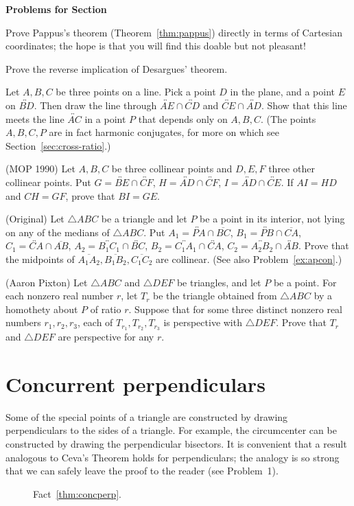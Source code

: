 \documentclass[12pt]{book}
\newcounter{exc}
\numberwithin{exc}{section}
\numberwithin{figure}{section}
\newenvironment{exer}{\vspace{0.1in}
\noindent \textbf{Problems for Section~\thesection} \vspace{0.1in}
\begin{list}{\arabic{exc}.}{\usecounter{exc}}}{\end{list}}
\numberwithin{equation}{theorem}
\def\ii{\item}
\def\line#1{\overleftrightarrow{#1}}
\def\seg#1{\overline{#1}}
\begin{document}
\begin{exer}
\ii
Prove Pappus's theorem (Theorem~\ref{thm:pappus}) directly in terms of 
Cartesian coordinates; the hope is that you will find this doable but not 
pleasant!
\ii \label{ex:des2}
Prove the reverse implication of Desargues' theorem.
 
\ii \label{ex:harmcon}
Let $A,B,C$ be three points on a line. Pick a point $D$ in the plane, 
and a point $E$ on $\line{BD}$. Then draw the line through $\line{AE} \cap 
\line{CD}$ and 
$\line{CE} \cap \line{AD}$. 
Show that this line meets the line $\line{AC}$ in a point $P$ 
that depends only on $A,B,C$. (The points $A,B,C,P$ are in fact harmonic
conjugates, 
for more on which see Section~\ref{sec:cross-ratio}.)
\ii (MOP 1990)
Let $A, B, C$ be three collinear points and $D, E, F$ three other 
collinear points. Put $G = \line{BE} \cap \line{CF}$, 
$H = \line{AD} \cap \line{CF}$, $I = \line{AD} \cap 
\line{CE}$. If $AI = HD$ and $CH = GF$, prove that $BI = GE$.
\ii (Original) \label{ex:apcon1}
Let $\triangle ABC$ be a triangle and 
let $P$ be a point in its interior, not lying on 
any of the medians of $\triangle ABC$. 
Put $A_1 = \line{PA} \cap \seg{BC}$,
$B_1 = \line{PB} \cap \seg{CA}$,
$C_1 = \line{CA} \cap \seg{AB}$,
$A_2 = \line{B_1C_1} \cap \line{BC}$,
$B_2 = \line{C_1A_1} \cap \line{CA}$,
$C_2 = \line{A_2B_2} \cap \line{AB}$.
Prove that the 
midpoints of $\seg{A_1A_2}, \seg{B_1B_2}, \seg{C_1C_2}$ 
are collinear. (See also
Problem~\ref{ex:apcon}.)
\ii (Aaron Pixton) 
Let $\triangle ABC$ 
and $\triangle DEF$ be triangles, and let $P$ be a point.
For each nonzero real number $r$, let $T_r$ be the triangle obtained
from $\triangle ABC$ by a homothety about $P$ of ratio $r$. Suppose that for
some three distinct nonzero real numbers
$r_1, r_2, r_3$, each of $T_{r_1}, T_{r_2}, T_{r_3}$ is perspective
with $\triangle DEF$. Prove that $T_r$ and $\triangle DEF$ are perspective for any $r$.
\end{exer}

\section{Concurrent perpendiculars}

Some of the special points of a triangle are constructed by drawing 
perpendiculars to the sides of a triangle. For example, the 
circumcenter can be constructed by drawing the perpendicular 
bisectors. It is convenient that a result analogous to Ceva's Theorem 
holds for perpendiculars; the analogy is so strong that we can safely 
leave the proof to the reader (see Problem~1). 
\begin{figure}
\caption{Fact~\ref{thm:concperp}.}
\end{figure}
\end{document}
